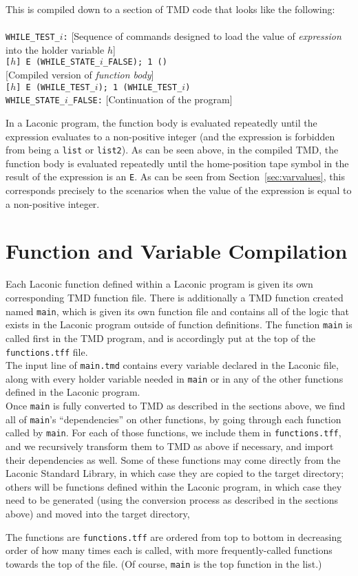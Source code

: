\documentclass[11pt]{article}
\begin{document}
This is compiled down to a section of TMD code that looks like the following: \\ \\
\texttt{WHILE_TEST_}$i$\texttt{:} [Sequence of commands designed to load the value of \emph{expression} into the holder variable $h$] \\
\texttt{[}$h$\texttt{] E (WHILE_STATE_}$i$\texttt{_FALSE); 1 ()} \\ 
{}[Compiled version of \emph{function body}] \\
\texttt{[}$h$\texttt{] E (WHILE_TEST_}$i$\texttt{); 1 (WHILE_TEST_}$i$\texttt{)} \\
\texttt{WHILE_STATE_}$i$\texttt{_FALSE:} [Continuation of the program] 

In a Laconic program, the function body is evaluated repeatedly until the expression evaluates to a non-positive integer (and the expression is forbidden from being a \texttt{list} or \texttt{list2}). As can be seen above, in the compiled TMD, the function body is evaluated repeatedly until the home-position tape symbol in the result of the expression is an \texttt{E}. As can be seen from Section~\ref{sec:varvalues}, this corresponds precisely to the scenarios when the value of the expression is equal to a non-positive integer.

\section{Function and Variable Compilation} 

Each Laconic function defined within a Laconic program is given its own corresponding TMD function file. There is additionally a TMD function created named \texttt{main}, which is given its own function file and contains all of the logic that exists in the Laconic program outside of function definitions. The function \texttt{main} is called first in the TMD program, and is accordingly put at the top of the \texttt{functions.tff} file. \\

The input line of \texttt{main.tmd} contains every variable declared in the Laconic file, along with every holder variable needed in \texttt{main} or in any of the other functions defined in the Laconic program. \\

Once \texttt{main} is fully converted to TMD as described in the sections above, we find all of \texttt{main}'s ``dependencies'' on other functions, by going through each function called by \texttt{main}. For each of those functions, we include them in \texttt{functions.tff}, and we recursively transform them to TMD as above if necessary, and import their dependencies as well. Some of these functions may come directly from the Laconic Standard Library, in which case they are copied to the target directory; others will be functions defined within the Laconic program, in which case they need to be generated (using the conversion process as described in the sections above) and moved into the target directory,

The functions are \texttt{functions.tff} are ordered from top to bottom in decreasing order of how many times each is called, with more frequently-called functions towards the top of the file. (Of course, \texttt{main} is the top function in the list.)
\end{document}
